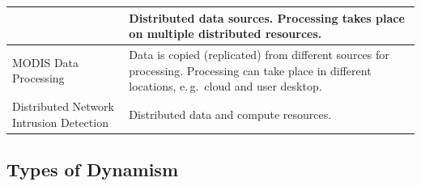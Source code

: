 \begin{table}[h]
\begin{scriptsize}
\begin{center}
\begin{tabular}{|p{3.5cm}|p{10.2cm}|}
                &Distributed data
                sources. Processing takes place on multiple distributed resources. \\
		\hline MODIS Data Processing & Data is copied
                (replicated) from different sources for processing.
                Processing can take place in different locations,
                e.\,g.\ cloud and
		user desktop. \\
		\hline
                Distributed Network Intrusion Detection  &Distributed data and compute resources.\\
		\hline
     \end{tabular}
    \end{center}
  \end{scriptsize}
\end{table}



\subsection{Types of Dynamism \label{sec:dynTypes}}

